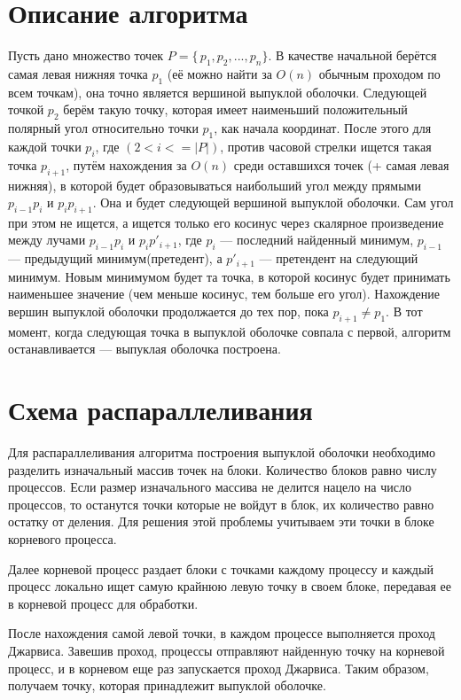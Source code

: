 \documentclass{report}
\begin{document}
\section*{Описание алгоритма}
Пусть дано множество точек $P=\{\,p_1, p_2, ..., p_n\}$. В качестве начальной берётся самая левая нижняя точка $p_1$ (её можно найти за $O(n)$ обычным проходом по всем точкам), она точно является вершиной выпуклой оболочки. Следующей точкой  $p_2$ берём такую точку, которая имеет наименьший положительный полярный угол относительно точки $p_1$, как начала координат. После этого для каждой точки $p_i$, где $(2<i<=|P|)$, против часовой стрелки ищется такая точка $p_{i+1}$, путём нахождения за $O(n)$ среди оставшихся точек (+ самая левая нижняя), в которой будет образовываться наибольший угол между прямыми $p_{i-1} p_i$ и $p_{i}p_{i+1}$. Она и будет следующей вершиной выпуклой оболочки. Сам угол при этом не ищется, а ищется только его косинус через скалярное произведение между лучами  $p_{i-1}p_{i}$ и $p_{i}p'_{i+1}$, где  $p_{i}$ — последний найденный минимум,  $p_{i-1}$ — предыдущий минимум(претедент), а $p'_{i+1}$ — претендент на следующий минимум. Новым минимумом будет та точка, в которой косинус будет принимать наименьшее значение (чем меньше косинус, тем больше его угол). Нахождение вершин выпуклой оболочки продолжается до тех пор, пока $p_{i+1}\neq p_{1}$. В тот момент, когда следующая точка в выпуклой оболочке совпала с первой, алгоритм останавливается — выпуклая оболочка построена.
\newpage

\section*{Схема распараллеливания}
Для распараллеливания алгоритма построения выпуклой оболочки необходимо разделить изначальный массив точек на блоки. Количество блоков равно числу процессов. Если размер изначального массива не делится нацело на число процессов, то останутся точки которые не войдут в блок, их количество равно остатку от деления. Для решения этой проблемы учитываем эти точки в блоке корневого процесса.
\par
Далее корневой процесс раздает блоки с точками каждому процессу и каждый процесс локально ищет самую крайнюю левую точку в своем блоке, передавая ее в корневой процесс для обработки.
\par
После нахождения самой левой точки, в каждом процессе выполняется проход Джарвиса. Завешив проход, процессы отправляют найденную точку на корневой процесс, и в корневом еще раз запускается проход Джарвиса. Таким образом, получаем точку, которая принадлежит выпуклой оболочке.  
\newpage
\end{document}
